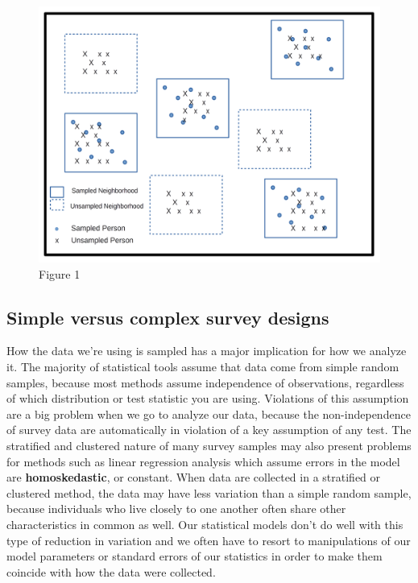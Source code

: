 \documentclass[
]{article}
\begin{document}
\begin{figure}
\centering
\includegraphics{images/MLdata.png}
\caption{Figure 1}
\end{figure}

\hypertarget{simple-versus-complex-survey-designs}{%
\subsection{Simple versus complex survey designs}\label{simple-versus-complex-survey-designs}}

How the data we're using is sampled has a major implication for how we analyze it. The majority of statistical tools assume that data come from simple random samples, because most methods assume independence of observations, regardless of which distribution or test statistic you are using. Violations of this assumption are a big problem when we go to analyze our data, because the non-independence of survey data are automatically in violation of a key assumption of any test. The stratified and clustered nature of many survey samples may also present problems for methods such as linear regression analysis which assume errors in the model are \textbf{homoskedastic}, or constant. When data are collected in a stratified or clustered method, the data may have less variation than a simple random sample, because individuals who live closely to one another often share other characteristics in common as well. Our statistical models don't do well with this type of reduction in variation and we often have to resort to manipulations of our model parameters or standard errors of our statistics in order to make them coincide with how the data were collected.
\end{document}
